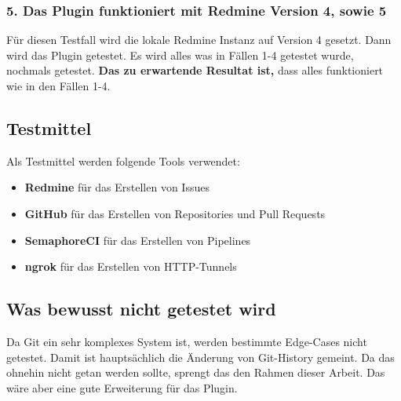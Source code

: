 \subsubsection{5. Das Plugin funktioniert mit Redmine Version 4, sowie 5}
Für diesen Testfall wird die lokale Redmine Instanz auf Version 4 gesetzt. Dann wird das Plugin getestet. Es wird
alles was in Fällen 1-4 getestet wurde, nochmals getestet. \newline
\textbf{Das zu erwartende Resultat ist,} dass alles funktioniert wie in den Fällen 1-4.

\subsection{Testmittel}
Als Testmittel werden folgende Tools verwendet:
\begin{itemize}
  \item \textbf{Redmine} für das Erstellen von Issues
  \item \textbf{GitHub} für das Erstellen von Repositories und Pull Requests
  \item \textbf{SemaphoreCI} für das Erstellen von Pipelines
  \item \textbf{ngrok} für das Erstellen von HTTP-Tunnels
\end{itemize}

\subsection{Was bewusst nicht getestet wird}
Da Git ein sehr komplexes System ist, werden bestimmte Edge-Cases nicht getestet. Damit ist hauptsächlich
die Änderung von Git-History gemeint. Da das ohnehin nicht getan werden sollte, sprengt das den Rahmen
dieser Arbeit. Das wäre aber eine gute Erweiterung für das Plugin.
